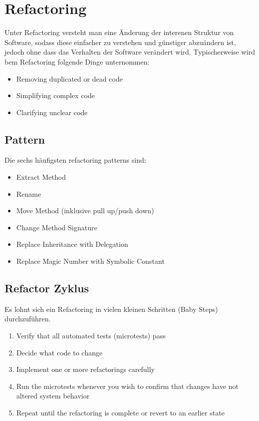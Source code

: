 \section{Refactoring}
Unter Refactoring versteht man eine Änderung der interenen Struktur von Software, sodass diese einfacher zu verstehen und günstiger abzuändern ist, jedoch ohne dass das Verhalten der Software verändert wird. Typischerweise wird bem Refactoring folgende Dinge unternommen:
\begin{itemize}
	\item Removing duplicated or dead code
	\item Simplifying complex code
	\item Clarifying unclear code
\end{itemize}

\subsection{Pattern}
Die sechs häufigsten refactoring patterns sind:

\begin{itemize}
	\item Extract Method
	\item Rename
	\item Move Method (inklusive pull up/push down)
	\item Change Method Signature
	\item Replace Inheritance with Delegation
	\item Replace Magic Number with Symbolic Constant
\end{itemize}

\subsection{Refactor Zyklus}
Es lohnt sich ein Refactoring in vielen kleinen Schritten (Baby Steps) durchzuführen.
\begin{enumerate}
	\item Verify that all automated tests (microtests) pass
	\item Decide what code to change
	\item Implement one or more refactorings carefully
	\item Run the microtests whenever you wish to confirm that changes have not altered system behavior
	\item Repeat until the refactoring is complete or revert to an earlier state
\end{enumerate}

